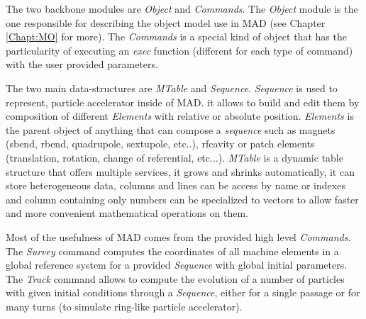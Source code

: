 The two backbone modules are \emph{Object} and \emph{Commands}. The \emph{Object}
module is the one responsible for describing the object model use in MAD (see
Chapter \ref{Chapt:MO} for more). The \emph{Commands} is a special kind of
object that has the particularity of executing an \emph{exec} function
(different for each type of command) with the user provided parameters.

The two main data-structures are \emph{MTable} and \emph{Sequence}.
\emph{Sequence} is used to represent, particle accelerator inside of MAD.
it allows to build and edit them by
composition of different \emph{Elements} with relative or absolute position.
\emph{Elements} is the parent object of anything that can compose a
\emph{sequence} such as magnets (sbend, rbend, quadrupole, sextupole, etc..),
rfcavity or patch elements (translation, rotation, change of referential,
etc...). \emph{MTable} is a dynamic table structure that offers multiple
services, it grows and shrinks automatically, it can store heterogeneous data,
columns and lines can be access by name or indexes and column containing only
numbers can be specialized to vectors to allow faster and more convenient
mathematical operations on them.

Most of the usefulness of MAD comes from the provided high level \emph{Commands}.
The \emph{Survey} command computes the coordinates of all machine elements in a
global reference system for a provided \emph{Sequence} with global initial
parameters. The \emph{Track} command allows to compute the evolution of a number
of particles with given initial conditions through a \emph{Sequence}, either for
a single passage or for many turns (to simulate ring-like particle accelerator).